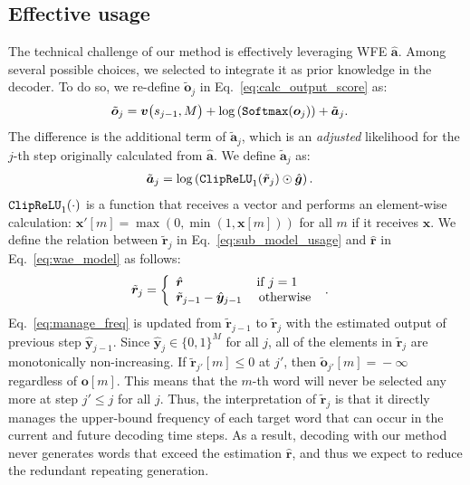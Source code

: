 \documentclass[11pt]{article}
\begin{document}
\subsection{Effective usage}
The technical challenge of our method is effectively leveraging WFE $\hat{\bm a}$. 
Among several possible choices, we selected to integrate it as prior knowledge in the decoder.
To do so, we re-define $\tilde{\bm{o}}_j$ in Eq.~\ref{eq:calc_output_score} as:
\begin{align}
 \displaystyle
& \displaystyle
 \tilde{\bm{o}}_j
 = \displaystyle
 \bm{v}\big(s_{j-1}, {M}\big)
 +
 \log
 \left(
 {\tt Softmax}(\bm{o}_{j})
 \right)
 + \tilde{\bm{a}}_j
\nonumber
  .
\end{align}
The difference is the additional term of $\tilde{\bm{a}}_j$,
   which is an {\it adjusted} likelihood for the $j$-th step originally calculated from $\hat{\bm{a}}$.
We define $\tilde{\bm{a}}_j$ as: 
\begin{align}
 &
  \tilde{\bm{a}}_j
 =
 \log
 \left(
 {\tt ClipReLU}_{1}(\tilde{\bm r}_{j})
 \odot
 \hat{\bm{g}}
 \right)
 \label{eq:sub_model_usage}
 .
\end{align}
$ {\tt ClipReLU}_{1}(\cdot)$ is a function that receives a vector and performs an element-wise calculation:
$\bm{x}'[m]\!=\!\max\left(0, \min(1, \bm{x}[m]) \right)$ for all $m$ if it receives $\bm{x}$.
We define the relation between $\tilde{\bm r}_j$ in Eq.~\ref{eq:sub_model_usage} and $\hat{\bm r}$ in Eq.~\ref{eq:wae_model} as follows:
\begin{align}
 \tilde{\bm r}_j
 &=\left\{
 \begin{array}{l}
  \hat{{\bm r}} \hspace{5.5em}\mbox{ if } j=1
   \\
  \tilde{\bm r}_{j-1} - \hat{\bm{y}}_{j-1} \hspace{1em}\mbox{ otherwise } 
 \end{array}
 \right.
 .
 \label{eq:manage_freq}
\end{align}
Eq.~\ref{eq:manage_freq} is updated from $\tilde{\bm r}_{j-1}$ to $\tilde{\bm r}_{j}$ with the estimated output of previous step $\hat{\bm{y}}_{j-1}$.
Since $\hat{\bm{y}}_{j} \!\in\! \{0,1\}^{M}$ for all $j$,
   all of the elements in $\tilde{\bm r}_j$ are monotonically non-increasing. 
If $\tilde{\bm{r}}_{j'}[m] \!\leq\! 0$ at $j'$, then $\tilde{\bm{o}}_{j'}[m]\!=\!-\infty$ regardless of ${\bm{o}}[m]$.
This means that the $m$-th word will never be selected any more at step $j'\leq j$ for all $j$.
Thus, the interpretation of $\tilde{\bm r}_j$ is that it directly manages the upper-bound frequency of each target word that can occur in the current and future decoding time steps.
As a result, decoding with our method never generates words that exceed the estimation $\hat{\bm r}$, and thus we expect to reduce the redundant repeating generation.
\end{document}
